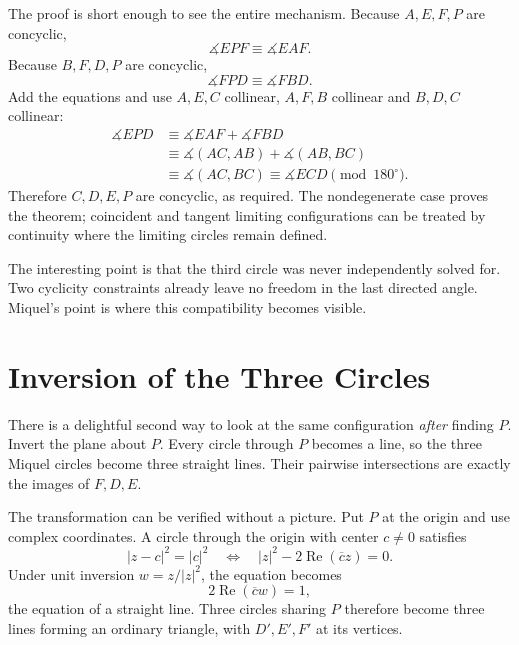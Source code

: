 The proof is short enough to see the entire mechanism. Because \(A,E,F,P\) are concyclic,
\[
 \measuredangle EPF\equiv\measuredangle EAF.
\]
Because \(B,F,D,P\) are concyclic,
\[
 \measuredangle FPD\equiv\measuredangle FBD.
\]
Add the equations and use \(A,E,C\) collinear, \(A,F,B\) collinear and \(B,D,C\) collinear:
\[
\begin{aligned}
 \measuredangle EPD
 &\equiv \measuredangle EAF+\measuredangle FBD\\
 &\equiv \measuredangle(AC,AB)+\measuredangle(AB,BC)\\
 &\equiv \measuredangle(AC,BC)
 \equiv\measuredangle ECD\pmod{180^\circ}.
\end{aligned}
\]
Therefore \(C,D,E,P\) are concyclic, as required. The nondegenerate case proves the theorem; coincident and tangent limiting configurations can be treated by continuity where the limiting circles remain defined.

The interesting point is that the third circle was never independently solved for. Two cyclicity constraints already leave no freedom in the last directed angle. Miquel's point is where this compatibility becomes visible.

\section{Inversion of the Three Circles}

There is a delightful second way to look at the same configuration \emph{after} finding \(P\). Invert the plane about \(P\). Every circle through \(P\) becomes a line, so the three Miquel circles become three straight lines. Their pairwise intersections are exactly the images of \(F,D,E\).

The transformation can be verified without a picture. Put \(P\) at the origin and use complex coordinates. A circle through the origin with center \(c\ne0\) satisfies
\[
 |z-c|^2=|c|^2
 \quad\Longleftrightarrow\quad
 |z|^2-2\operatorname{Re}(\overline c z)=0.
\]
Under unit inversion \(w=z/|z|^2\), the equation becomes
\[
 \boxed{2\operatorname{Re}(\overline c w)=1,}
\]
the equation of a straight line. Three circles sharing \(P\) therefore become three lines forming an ordinary triangle, with \(D',E',F'\) at its vertices.

